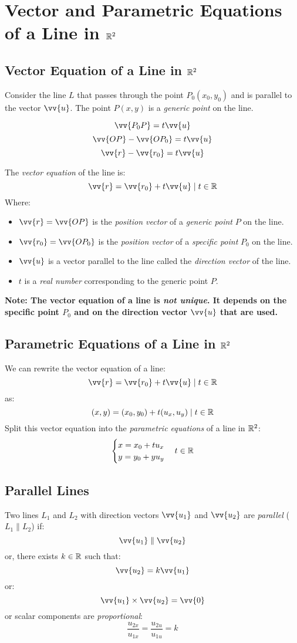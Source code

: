 \section{Vector and Parametric Equations of a Line in $\mathbb{R}^2$}
\subsection{Vector Equation of a Line in $\mathbb{R}^2$}
	Consider the line $L$ that passes through the point $P_0 (x_0, y_0)$ and is parallel to the vector $\vv{u}$.
	The point $P(x,y)$ is a \emph{generic point} on the line.

	\[\vv{P_0P} = t\vv{u}\]
	\[\vv{OP} - \vv{OP_0} = t\vv{u}\]
	\[\vv{r} - \vv{r_0} = t\vv{u}\]

	The \emph{vector equation} of the line is:
	\[\vv{r} = \vv{r_0} + t\vv{u} \such t \in \real\]
	Where:
	\begin{itemize}
		\item $\vv{r} = \vv{OP}$ is the \emph{position vector} of a \emph{generic point} $P$ on the line.
		\item $\vv{r_0} = \vv{OP_0}$ is the \emph{position vector} of a \emph{specific point} $P_0$ on the line.
		\item $\vv{u}$ is a vector parallel to the line called the \emph{direction vector} of the line.
		\item $t$ is a \emph{real number} corresponding to the generic point $P$.
	\end{itemize}
	\textbf{Note: The vector equation of a line is \emph{not unique}.
	It depends on the specific point $P_0$ and on the direction vector $\vv{u}$ that are used.}
\subsection{Parametric Equations of a Line in $\mathbb{R}^2$}
	We can rewrite the vector equation of a line:
	\[\vv{r} = \vv{r_0} + t\vv{u} \such t \in \real\]
	as:
	\[(x, y) = (x_0, y_0) + t(u_x, u_y) \mid t \in \mathbb{R}\]
	Split this vector equation into the \emph{parametric equations} of a line in $\mathbb{R}^2$:
	\begin{equation*}
		\begin{cases}
			x = x_0 + tu_x\\
			y = y_0 + yu_y
		\end{cases}
		t \in \mathbb{R}
	\end{equation*}
\subsection{Parallel Lines}
	Two lines $L_1$ and $L_2$ with direction vectors $\vv{u_1}$ and $\vv{u_2}$ are \emph{parallel} ($L_1 \parallel L_2$) if:
	\[\vv{u_1} \parallel \vv{u_2}\]
	or, there exists $k \in \mathbb{R}$ such that:
	\[\vv{u_2} = k\vv{u_1}\]
	or:
	\[\vv{u_1} \times \vv{u_2} = \vv{0}\]
	or scalar components are \emph{proportional}:
	\[\frac{u_{2x}}{u_{1x}} = \frac{u_{2u}}{u_{1u}} = k\]
